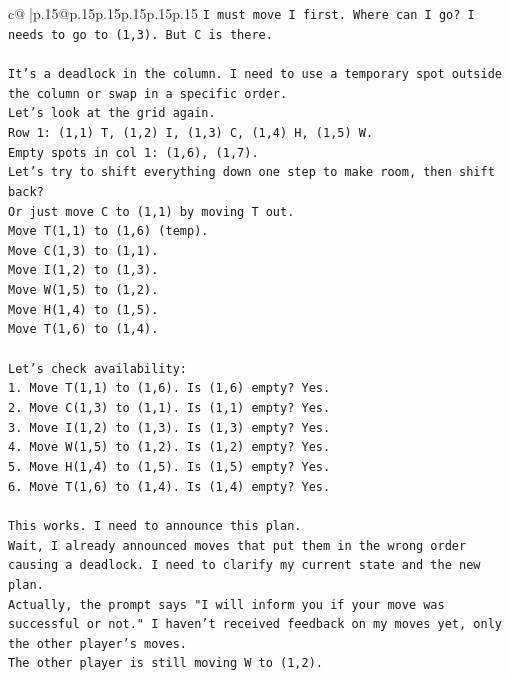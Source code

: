 \documentclass{article}
\begin{document}
{\begin{supertabular}{c@{$\;$}|p{.15\linewidth}@{}p{.15\linewidth}p{.15\linewidth}p{.15\linewidth}p{.15\linewidth}p{.15\linewidth}}
{{{\texttt{I must move I first. Where can I go? I needs to go to (1,3). But C is there.} \\
\\ 
\texttt{It's a deadlock in the column. I need to use a temporary spot outside the column or swap in a specific order.} \\
\texttt{Let's look at the grid again.} \\
\texttt{Row 1: (1,1) T, (1,2) I, (1,3) C, (1,4) H, (1,5) W.} \\
\texttt{Empty spots in col 1: (1,6), (1,7).} \\
\texttt{Let's try to shift everything down one step to make room, then shift back?} \\
\texttt{Or just move C to (1,1) by moving T out.} \\
\texttt{Move T(1,1) to (1,6) (temp).} \\
\texttt{Move C(1,3) to (1,1).} \\
\texttt{Move I(1,2) to (1,3).} \\
\texttt{Move W(1,5) to (1,2).} \\
\texttt{Move H(1,4) to (1,5).} \\
\texttt{Move T(1,6) to (1,4).} \\
\\ 
\texttt{Let's check availability:} \\
\texttt{1. Move T(1,1) to (1,6). Is (1,6) empty? Yes.} \\
\texttt{2. Move C(1,3) to (1,1). Is (1,1) empty? Yes.} \\
\texttt{3. Move I(1,2) to (1,3). Is (1,3) empty? Yes.} \\
\texttt{4. Move W(1,5) to (1,2). Is (1,2) empty? Yes.} \\
\texttt{5. Move H(1,4) to (1,5). Is (1,5) empty? Yes.} \\
\texttt{6. Move T(1,6) to (1,4). Is (1,4) empty? Yes.} \\
\\ 
\texttt{This works. I need to announce this plan.} \\
\texttt{Wait, I already announced moves that put them in the wrong order causing a deadlock. I need to clarify my current state and the new plan.} \\
\texttt{Actually, the prompt says "I will inform you if your move was successful or not." I haven't received feedback on my moves yet, only the other player's moves.} \\
\texttt{The other player is still moving W to (1,2).} \\
}}}
\end{supertabular}}
\end{document}
